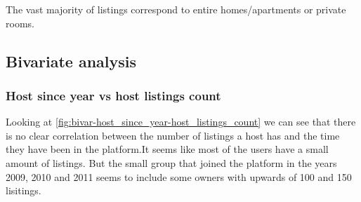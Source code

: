 
The vast majority of listings correspond to entire homes/apartments or private rooms.

\pagebreak
\subsection{Bivariate analysis}%
\subsubsection{Host since year vs host listings count}


Looking at \cref{fig:bivar-host_since_year-host_listings_count} we can see that there is no clear correlation between the number of listings a host has and the time they have been in the platform.It seems like most of the users have a small amount of listings. 
But the small group that joined the platform in the years 2009, 2010 and 2011 seems to include some owners with upwards of 100 and 150 lisitings.


\pagebreak


\label{sub:bivariate_analysis}


